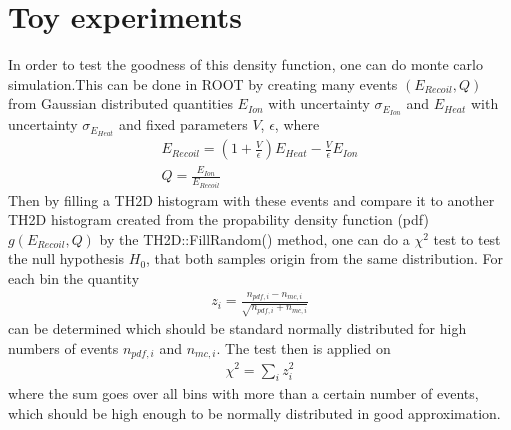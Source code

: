 \documentclass[10pt, a4paper]{article}
\begin{document}
\section{Toy experiments}
In order to test the goodness of this density function, one can do monte carlo simulation.This can be done in ROOT by creating many events $(E_{Recoil},Q)$ from Gaussian distributed quantities $E_{Ion}$ with uncertainty $\sigma_{E_{Ion}}$ and $E_{Heat}$ with uncertainty $\sigma_{E_{Heat}}$ and fixed parameters $V$, $\epsilon$,
where
\begin{gather}
E_{Recoil} = \left( 1 + \frac{V}{\epsilon} \right) E_{Heat} - \frac{V}{\epsilon} E_{Ion} \\
Q = \frac{E_{Ion}}{E_{Recoil}}
\end{gather}
Then by filling a TH2D histogram with these events and compare it to another TH2D histogram created from the propability density function (pdf) $g(E_{Recoil},Q)$ by the TH2D::FillRandom() method, one can do a $\chi^2$ test to test the null hypothesis $H_0$, that both samples origin from the same distribution.
For each bin the quantity
\begin{gather}
z_i = \frac{n_{pdf,i} - n_{mc,i}}{\sqrt{n_{pdf,i}+n_{mc,i}}}
\end{gather}
can be determined which should be standard normally distributed for high numbers of events $n_{pdf,i}$ and $n_{mc,i}$.
The test then is applied on
\begin{gather}
\chi^2 = \sum_i z_i^2
\end{gather}
where the sum goes over all bins with more than a certain number of events, which should be high enough to be normally distributed in good approximation. \\
\end{document}
